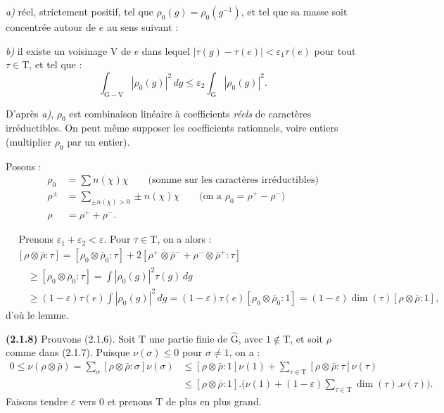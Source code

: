 \documentclass[11pt,leqno]{article}
\newcommand{\Page}[1]{\ifvmode\noindent\else\unskip\ \fi{\footnotesize\textcolor{gray}{[p.\,#1]}}\ \ignorespaces}
\begin{document}
\noindent\textit{a)} réel, strictement positif, tel que \(\rho_0(g)=\rho_0(g^{-1})\), et tel que sa masse soit concentrée autour de \(e\) au sens suivant :

\noindent\textit{b)} il existe un voisinage \(\mathrm{V}\) de \(e\) dans lequel \(|\tau(g)-\tau(e)|<\varepsilon_1\tau(e)\) pour tout \(\tau\in\mathrm{T}\), et tel que :
\[
\int_{\mathrm{G}-\mathrm{V}}|\rho_0(g)|^2\,dg
 \leq\varepsilon_2\int_{\mathrm{G}}|\rho_0(g)|^2.
\]

D’après \textit{a)}, \(\rho_0\) est combinaison linéaire à coefficients \textit{réels} de caractères irréductibles. On peut même supposer les coefficients rationnels, voire entiers (multiplier \(\rho_0\) par un entier).

Posons :
\begin{align*}
\rho_0&=\sum n(\chi)\chi
  \qquad\text{(somme sur les caractères irréductibles)}\\
\rho^\pm&=\sum_{\pm n(\chi)>0}\pm n(\chi)\chi
  \qquad\text{(on a }\rho_0=\rho^+-\rho^-\text{)}\\
\rho&=\rho^++\rho^-.
\tag*{et :}
\end{align*}

\Page{191}
Prenons \(\varepsilon_1+\varepsilon_2<\varepsilon\). Pour \(\tau\in\mathrm{T}\), on a alors :
\[
\begin{aligned}
&[\rho\otimes\bar{\rho}:\tau]
 =[\rho_0\otimes\bar{\rho}_0:\tau]
   +2[\rho^+\otimes\bar{\rho}^-+\rho^-\otimes\bar{\rho}^+:\tau]\\
&\quad\geq[\rho_0\otimes\bar{\rho}_0:\tau]
 =\int|\rho_0(g)|^2\tau(g)\,dg\\
&\quad\geq(1-\varepsilon)\tau(e)\int|\rho_0(g)|^2\,dg
 =(1-\varepsilon)\tau(e)[\rho_0\otimes\bar{\rho}_0:1]
 =(1-\varepsilon)\dim(\tau)[\rho\otimes\bar{\rho}:1],
\end{aligned}
\]
d’où le lemme.

\textbf{(2.1.8)} Prouvons (2.1.6). Soit \(\mathrm{T}\) une partie finie de \(\widehat{\mathrm{G}}\), avec \(1\notin\mathrm{T}\), et soit \(\rho\) comme dans (2.1.7). Puisque \(\nu(\sigma)\leq0\) pour \(\sigma\neq1\), on a :
\[
\begin{aligned}
0\leq\nu(\rho\otimes\bar{\rho})
 =\sum_\sigma[\rho\otimes\bar{\rho}:\sigma]\nu(\sigma)
 &\leq[\rho\otimes\bar{\rho}:1]\nu(1)
   +\sum_{\tau\in\mathrm{T}}[\rho\otimes\bar{\rho}:\tau]\nu(\tau)\\
 &\leq[\rho\otimes\bar{\rho}:1].
 \biggl(\nu(1)+(1-\varepsilon)
   \sum_{\tau\in\mathrm{T}}\dim(\tau).\nu(\tau)\biggr).
\end{aligned}
\]
Faisons tendre \(\varepsilon\) vers \(0\) et prenons \(\mathrm{T}\) de plus en plus grand.
\end{document}
